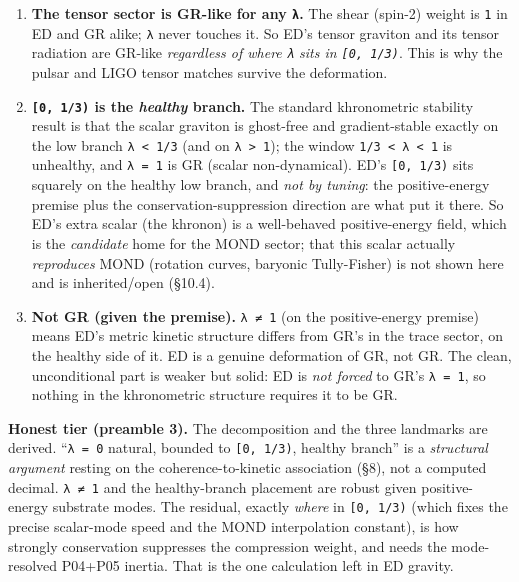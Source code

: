 \documentclass[
]{article}
\begin{document}
\begin{enumerate}
\def\labelenumi{\arabic{enumi}.}
\item
  \textbf{The tensor sector is GR-like for any \texttt{λ}.} The shear
  (spin-2) weight is \texttt{1} in ED and GR alike; \texttt{λ} never
  touches it. So ED's tensor graviton and its tensor radiation are
  GR-like \emph{regardless of where \texttt{λ} sits in
  \texttt{{[}0,\ 1/3)}}. This is why the pulsar and LIGO tensor matches
  survive the deformation.
\item
  \textbf{\texttt{{[}0,\ 1/3)} is the \emph{healthy} branch.} The
  standard khronometric stability result is that the scalar graviton is
  ghost-free and gradient-stable exactly on the low branch
  \texttt{λ\ \textless{}\ 1/3} (and on \texttt{λ\ \textgreater{}\ 1});
  the window \texttt{1/3\ \textless{}\ λ\ \textless{}\ 1} is unhealthy,
  and \texttt{λ\ =\ 1} is GR (scalar non-dynamical). ED's
  \texttt{{[}0,\ 1/3)} sits squarely on the healthy low branch, and
  \emph{not by tuning}: the positive-energy premise plus the
  conservation-suppression direction are what put it there. So ED's
  extra scalar (the khronon) is a well-behaved positive-energy field,
  which is the \emph{candidate} home for the MOND sector; that this
  scalar actually \emph{reproduces} MOND (rotation curves, baryonic
  Tully-Fisher) is not shown here and is inherited/open (§10.4).
\item
  \textbf{Not GR (given the premise).} \texttt{λ\ ≠\ 1} (on the
  positive-energy premise) means ED's metric kinetic structure differs
  from GR's in the trace sector, on the healthy side of it. ED is a
  genuine deformation of GR, not GR. The clean, unconditional part is
  weaker but solid: ED is \emph{not forced} to GR's \texttt{λ\ =\ 1}, so
  nothing in the khronometric structure requires it to be GR.
\end{enumerate}

\textbf{Honest tier (preamble 3).} The decomposition and the three
landmarks are derived. ``\texttt{λ\ =\ 0} natural, bounded to
\texttt{{[}0,\ 1/3)}, healthy branch'' is a \emph{structural argument}
resting on the coherence-to-kinetic association (§8), not a computed
decimal. \texttt{λ\ ≠\ 1} and the healthy-branch placement are robust
given positive-energy substrate modes. The residual, exactly
\emph{where} in \texttt{{[}0,\ 1/3)} (which fixes the precise
scalar-mode speed and the MOND interpolation constant), is how strongly
conservation suppresses the compression weight, and needs the
mode-resolved P04+P05 inertia. That is the one calculation left in ED
gravity.
\end{document}
